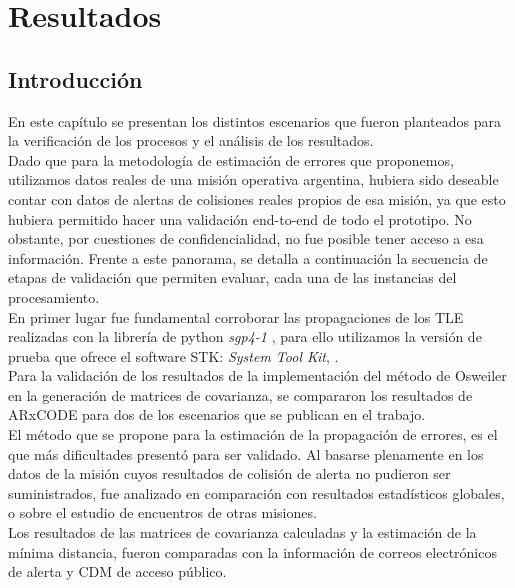 \chapter{Resultados}
\label{chap:resultados}


\section{Introducci\'on}
En este cap\'itulo se presentan los distintos escenarios que fueron planteados para la verificaci\'on de los procesos y el an\'alisis de los resultados.\\

Dado que para la metodolog\'ia de estimaci\'on de errores que proponemos, utilizamos datos reales de una misi\'on operativa argentina, hubiera sido
deseable contar con datos de alertas de colisiones reales propios de esa misi\'on, ya que esto hubiera permitido hacer una validaci\'on end-to-end de todo el prototipo. No obstante, por cuestiones de confidencialidad, no fue posible tener acceso a esa informaci\'on.
Frente a este panorama, se detalla a continuaci\'on la secuencia de etapas de validaci\'on que permiten evaluar, cada una de las instancias del procesamiento.\\

En primer lugar fue fundamental corroborar las propagaciones de los TLE realizadas con la librer\'ia de python {\it{sgp4-1}} \citep{sgp4python}, para ello utilizamos la versi\'on de prueba que ofrece el software STK: {\it{System Tool Kit}}, \citep{stk}.\\

Para la validaci\'on de los resultados de la implementaci\'on del m\'etodo de Osweiler en la generaci\'on de matrices de covarianza, se compararon los resultados de ARxCODE para dos de los escenarios que se publican en el trabajo.\\

El m\'etodo que se propone para la estimaci\'on de la propagaci\'on de errores, es el que m\'as dificultades present\'o para ser validado. Al basarse plenamente en los datos de la misi\'on cuyos resultados de colisi\'on de alerta no pudieron ser suministrados, fue analizado en comparaci\'on con resultados estad\'isticos globales, o sobre el estudio de encuentros de otras misiones.\\

Los resultados de las matrices de covarianza calculadas y la estimaci\'on de la m\'inima distancia, fueron comparadas con la informaci\'on de correos electr\'onicos de alerta y CDM de acceso p\'ublico.\\

